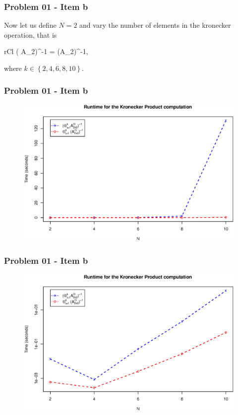 \documentclass[12pt, aspectratio=169]{beamer}
\begin{document}
\begin{frame}
	\frametitle{Problem 01 - Item b}

	Now let us define \(N=2\) and vary the number of elements in the kronecker operation, that is
	\begin{IEEEeqnarray}{rCl}
		\left( A_{2}\right)^{-1} =  \left(A_{2}\right)^{-1},
	\end{IEEEeqnarray}
	where \(k\in \left\{2,4,6,8,10\right\}\).

\end{frame}

\begin{frame}
	\frametitle{Problem 01 - Item b}
	\begin{figure}
		\includegraphics[scale=0.4]{figs/1b.eps}
	\end{figure}
\end{frame}

\begin{frame}
	\frametitle{Problem 01 - Item b}
	\begin{figure}
		\includegraphics[scale=0.4]{figs/1b_log.eps}
	\end{figure}
\end{frame}
\end{document}
